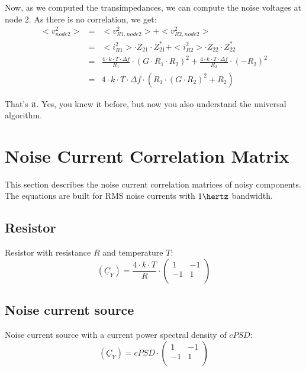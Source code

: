 Now, as we computed the transimpedances, we can compute the noise
voltages at node 2. As there is no correlation, we get:
\begin{eqnarray}
<v_{node2}^2> & = & <v_{R1,node2}^2> + <v_{R2,node2}^2> \\
  & = & <i_{R1}^2>\cdot Z_{21}\cdot Z_{21}^* + <i_{R2}^2>\cdot Z_{22}\cdot Z_{22}^* \\
  & = & \frac{4\cdot k\cdot T\cdot \Delta f}{R_1} \cdot (G\cdot R_1\cdot R_2)^2 +
        \frac{4\cdot k\cdot T\cdot \Delta f}{R_2} \cdot (-R_2)^2 \\
  & = & 4\cdot k\cdot T\cdot \Delta f\cdot \left( R_1\cdot (G\cdot R_2)^2 + R_2 \right)
\end{eqnarray}

That's it. Yes, you knew it before, but now you also understand
the universal algorithm.

\section{Noise Current Correlation Matrix}

This section describes the noise current correlation matrices of noisy
components.  The equations are built for RMS noise currents with
$1\hertz$ bandwidth.

\subsection{Resistor}

Resistor with resistance $R$ and temperature $T$:
\begin{equation}
(\underline{C}_Y) = \frac{4\cdot k\cdot T}{R} \cdot
\begin{pmatrix}
 1 & -1 \\
-1 &  1 \\
\end{pmatrix}
\end{equation}

\subsection{Noise current source}

Noise current source with a current power spectral density of $cPSD$:
\begin{equation}
(\underline{C}_Y) = cPSD \cdot
\begin{pmatrix}
 1 & -1 \\
-1 &  1 \\
\end{pmatrix}
\end{equation}

